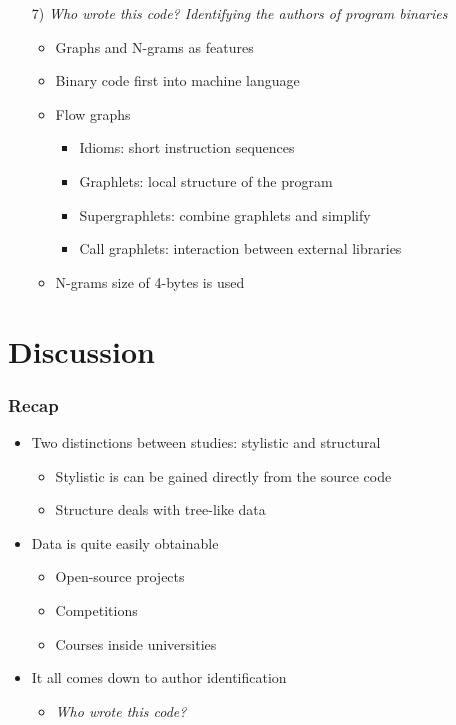 \documentclass[t,12pt,pdftex]{beamer}
\begin{document}
\begin{frame}
	\vspace{0.5in}
	\begin{itemize}
		\item[7)] \textit{Who wrote
this code? Identifying the authors of program binaries}
		\begin{itemize}
			\item Graphs and N-grams as features
			\item Binary code first into machine language
			\item Flow graphs
			\begin{itemize}
				\item Idioms: short instruction sequences
				\item Graphlets: local structure of the program
				\item Supergraphlets: combine graphlets and simplify
				\item Call graphlets: interaction between external libraries
			\end{itemize}
			\item N-grams size of 4-bytes is used
		\end{itemize}
	\end{itemize}
\end{frame}


\section{Discussion}

\begin{frame}
	\frametitle{Recap}
	\begin{itemize}
		\item Two distinctions between studies: stylistic and structural
		\begin{itemize}
			\item Stylistic is can be gained directly from the source code
			\item Structure deals with tree-like data
		\end{itemize}
		\item Data is quite easily obtainable
		\begin{itemize}
			\item Open-source projects
			\item Competitions
			\item Courses inside universities
		\end{itemize}
		\item It all comes down to author identification
		\begin{itemize}
			\item \textit{Who wrote this code?}
		\end{itemize}
	\end{itemize}
\end{frame}
\end{document}
